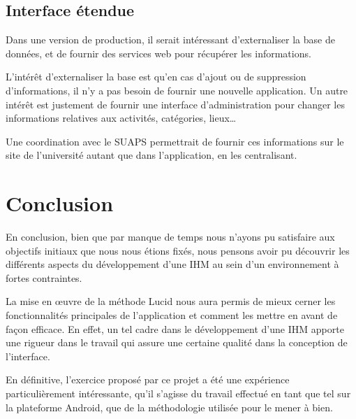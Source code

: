 \documentclass[french, titlepage, 11pt, a4paper]{article}
\begin{document}
    \subsection{Interface étendue}

        Dans une version de production, il serait intéressant d'externaliser la
        base de données, et de fournir des services web pour récupérer les
        informations.

        L'intérêt d'externaliser la base est qu'en cas d'ajout ou de suppression
        d'informations, il n'y a pas besoin de fournir une nouvelle application.
        Un autre intérêt est justement de fournir une interface d'administration
        pour changer les informations relatives aux activités, catégories,
        lieux\dots

        Une coordination avec le SUAPS permettrait de fournir ces informations
        sur le site de l'université autant que dans l'application, en les centralisant.


\section*{Conclusion}

En conclusion, bien que par manque de temps nous n'ayons pu satisfaire aux
objectifs initiaux que nous nous étions fixés, nous pensons avoir pu découvrir
les différents aspects du développement d'une IHM au sein d'un environnement à
fortes contraintes.

La mise en \oe uvre de la méthode Lucid nous aura permis de mieux cerner
les fonctionnalités principales de l'application et comment les mettre en avant
de façon efficace.
En effet, un tel cadre dans le développement d'une IHM apporte une rigueur dans
le travail qui assure une certaine qualité dans la conception de l'interface.

En définitive, l'exercice proposé par ce projet a été une expérience
particulièrement intéressante, qu'il s'agisse du travail effectué en tant que
tel sur la plateforme Android, que de la méthodologie utilisée pour le mener à
bien.
\end{document}
